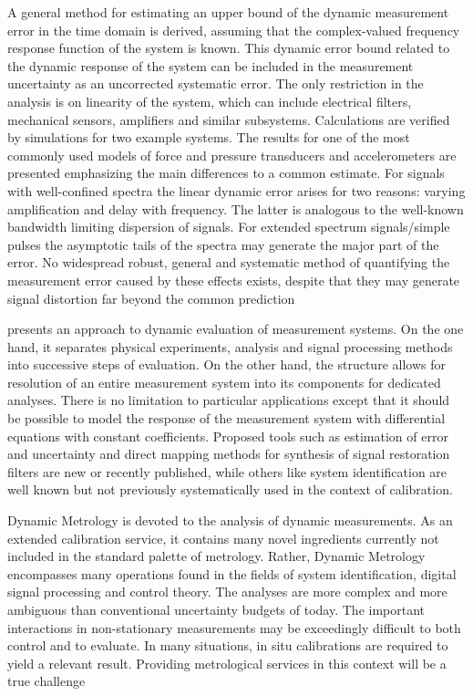 \documentclass[11pt]{article}
\begin{document}
\citet{Hessling06} A general method for estimating an upper bound of the dynamic measurement error in the time domain is derived, assuming that the complex-valued frequency response function of the system is known. This dynamic error bound related to the dynamic response of the system can be included in the measurement uncertainty as an uncorrected systematic error. The only restriction in the analysis is on linearity of the system, which can include electrical filters, mechanical sensors, amplifiers and similar subsystems. Calculations are verified by simulations for two example systems. The results for one of the most commonly used models of force and pressure transducers and accelerometers are presented emphasizing the main differences to a common estimate. For signals with well-confined spectra the linear dynamic error arises for two reasons: varying amplification and delay with frequency. The latter is analogous to the well-known bandwidth limiting dispersion of signals. For extended spectrum signals/simple pulses the asymptotic tails of the spectra may generate the major part of the error. No widespread robust, general and systematic method of quantifying the measurement error caused by these effects exists, despite that they may generate signal distortion far beyond the common prediction

\citet{Hessling08b} presents an approach to dynamic evaluation of measurement systems. On the one hand, it separates physical experiments, analysis and signal processing methods into successive steps of evaluation. On the other hand, the structure allows for resolution of an entire measurement system into its components for dedicated analyses. There is no limitation to particular applications except that it should be possible to model the response of the measurement system with differential equations with constant coefficients. Proposed tools such as estimation of error and uncertainty and direct mapping methods for synthesis of signal restoration filters are new or recently published, while others like system identification are well known but not previously systematically used in the context of calibration.

\citet{Hessling10} Dynamic Metrology is devoted to the analysis of dynamic measurements.  As  an  extended  calibration  service,  it  contains  many  novel  ingredients currently not included in the standard palette of metrology. Rather, Dynamic Metrology encompasses many operations found in the fields of system identification, digital signal processing and control theory. The analyses are more complex and more ambiguous than conventional uncertainty budgets of today. The important interactions in non-stationary measurements  may  be  exceedingly  difficult  to  both  control  and  to  evaluate.  In  many situations, in situ calibrations are required to yield a relevant result. Providing metrological services in this context will be a true challenge
\end{document}
